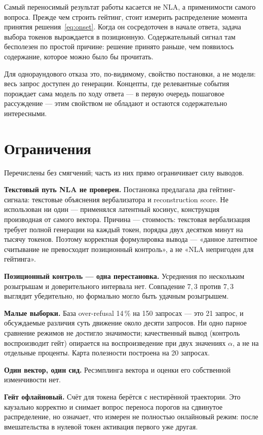 \documentclass[11pt,a4paper]{article}
\begin{document}
Самый переносимый результат работы касается не NLA, а применимости самого
вопроса. Прежде чем строить гейтинг, стоит измерить распределение момента
принятия решения~\eqref{eq:onset}. Когда он сосредоточен в начале ответа, задача
выбора токенов вырождается в позиционную. Содержательный сигнал там бесполезен по
простой причине: решение принято раньше, чем появилось содержание, которое можно
было бы прочитать.

Для однораундового отказа это, по-видимому, свойство постановки, а не модели:
весь запрос доступен до генерации. Концепты, где релевантные события порождает
сама модель по ходу ответа --- в первую очередь пошаговое рассуждение --- этим
свойством не обладают и остаются содержательно интересными.

\section{Ограничения}

Перечислены без смягчений; часть из них прямо ограничивает силу выводов.

\textbf{Текстовый путь NLA не проверен.} Постановка предлагала два
гейтинг-сигнала: текстовые объяснения вербализатора и reconstruction score. Не
использован ни один --- применялся латентный косинус, конструкция производная от
самого вектора. Причина --- стоимость: текстовая вербализация требует полной
генерации на каждый токен, порядка двух десятков минут на тысячу токенов. Поэтому
корректная формулировка вывода --- «данное латентное считывание не превосходит
позиционный контроль», а не «NLA непригоден для гейтинга».

\textbf{Позиционный контроль --- одна перестановка.} Усреднения по нескольким
розыгрышам и доверительного интервала нет. Совпадение $7{,}3$ против $7{,}3$
выглядит убедительно, но формально могло быть удачным розыгрышем.

\textbf{Малые выборки.} База over-refusal 14\,\% на 150 запросах --- это 21
запрос, и обсуждаемые различия суть движение около десяти запросов. Ни одно
парное сравнение режимов не достигло значимости; качественный вывод (контроль
воспроизводит гейт) опирается на воспроизведение при двух значениях $\alpha$, а
не на отдельные проценты. Карта полезности построена на 20 запросах.

\textbf{Один вектор, один сид.} Ресэмплинга вектора и оценки его собственной
изменчивости нет.

\textbf{Гейт офлайновый.} Счёт для токена берётся с нестирённой траектории. Это
каузально корректно и снимает вопрос переноса порогов на сдвинутое
распределение, но означает, что измерен не полностью онлайновый режим: после
вмешательства в нулевой токен активация первого уже другая.
\end{document}
